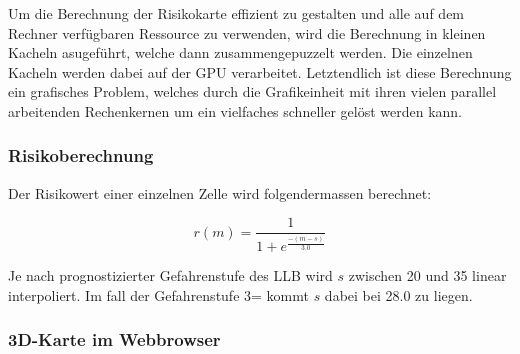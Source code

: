 Um die Berechnung der Risikokarte effizient zu gestalten und alle auf dem Rechner verfügbaren Ressource zu verwenden, wird die Berechnung in kleinen Kacheln asugeführt, welche dann zusammengepuzzelt werden. Die einzelnen Kacheln werden dabei auf der GPU verarbeitet. Letztendlich ist diese Berechnung ein grafisches Problem, welches durch die Grafikeinheit mit ihren vielen parallel arbeitenden Rechenkernen um ein vielfaches schneller gelöst werden kann.

\subsubsection{Risikoberechnung}

Der Risikowert einer einzelnen Zelle wird folgendermassen berechnet:

$$
r(m) = \frac{1}{1 + e^{\frac{-\left(m-s\right)}{3.0}}}
$$

Je nach prognostizierter Gefahrenstufe des LLB wird $s$ zwischen 20 und 35 linear interpoliert. Im fall der Gefahrenstufe 3= kommt $s$ dabei bei 28.0 zu liegen.

\subsubsection{3D-Karte im Webbrowser}